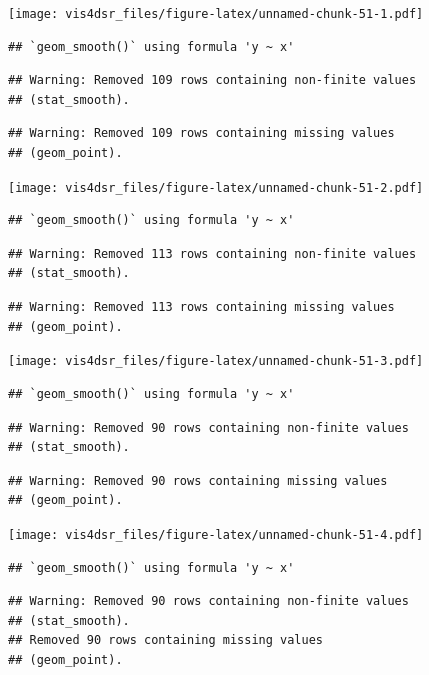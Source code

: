\documentclass[
]{krantz}
\begin{document}
\texttt{[image: vis4dsr\_files/figure-latex/unnamed-chunk-51-1.pdf]}

\begin{verbatim}
## `geom_smooth()` using formula 'y ~ x'
\end{verbatim}

\begin{verbatim}
## Warning: Removed 109 rows containing non-finite values
## (stat_smooth).
\end{verbatim}

\begin{verbatim}
## Warning: Removed 109 rows containing missing values
## (geom_point).
\end{verbatim}

\texttt{[image: vis4dsr\_files/figure-latex/unnamed-chunk-51-2.pdf]}

\begin{verbatim}
## `geom_smooth()` using formula 'y ~ x'
\end{verbatim}

\begin{verbatim}
## Warning: Removed 113 rows containing non-finite values
## (stat_smooth).
\end{verbatim}

\begin{verbatim}
## Warning: Removed 113 rows containing missing values
## (geom_point).
\end{verbatim}

\texttt{[image: vis4dsr\_files/figure-latex/unnamed-chunk-51-3.pdf]}

\begin{verbatim}
## `geom_smooth()` using formula 'y ~ x'
\end{verbatim}

\begin{verbatim}
## Warning: Removed 90 rows containing non-finite values
## (stat_smooth).
\end{verbatim}

\begin{verbatim}
## Warning: Removed 90 rows containing missing values
## (geom_point).
\end{verbatim}

\texttt{[image: vis4dsr\_files/figure-latex/unnamed-chunk-51-4.pdf]}

\begin{verbatim}
## `geom_smooth()` using formula 'y ~ x'
\end{verbatim}

\begin{verbatim}
## Warning: Removed 90 rows containing non-finite values
## (stat_smooth).
## Removed 90 rows containing missing values
## (geom_point).
\end{verbatim}
\end{document}
